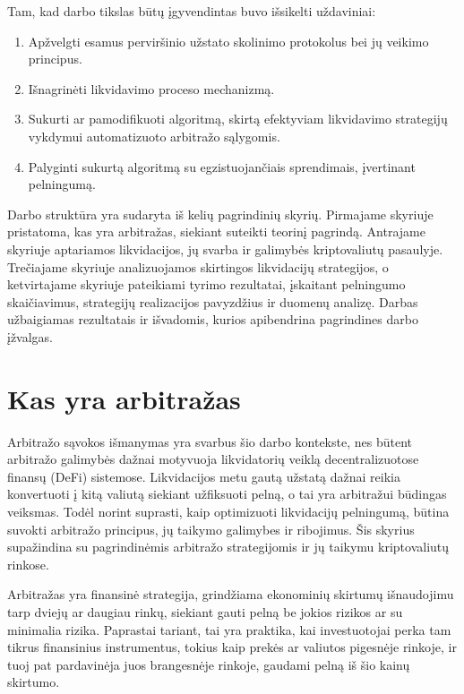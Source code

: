 \documentclass[]{VUMIFTemplateClass}
\begin{document}
Tam, kad darbo tikslas būtų įgyvendintas buvo išsikelti uždaviniai:
\begin{enumerate}
    \item Apžvelgti esamus perviršinio užstato skolinimo protokolus bei jų veikimo principus.
    \item Išnagrinėti likvidavimo proceso mechanizmą.
    \item Sukurti ar pamodifikuoti algoritmą, skirtą efektyviam likvidavimo strategijų vykdymui automatizuoto arbitražo sąlygomis.
    \item Palyginti sukurtą algoritmą su egzistuojančiais sprendimais, įvertinant pelningumą.
\end{enumerate}

Darbo struktūra yra sudaryta iš kelių pagrindinių skyrių. Pirmajame skyriuje pristatoma, kas yra arbitražas, siekiant suteikti teorinį pagrindą. Antrajame skyriuje aptariamos likvidacijos, jų svarba ir galimybės kriptovaliutų pasaulyje. Trečiajame skyriuje analizuojamos skirtingos likvidacijų strategijos, o ketvirtajame skyriuje pateikiami tyrimo rezultatai, įskaitant pelningumo skaičiavimus, strategijų realizacijos pavyzdžius ir duomenų analizę. Darbas užbaigiamas rezultatais ir išvadomis, kurios apibendrina pagrindines darbo įžvalgas.


\section{Kas yra arbitražas}
Arbitražo sąvokos išmanymas yra svarbus šio darbo kontekste, nes būtent arbitražo galimybės dažnai motyvuoja likvidatorių veiklą decentralizuotose finansų (DeFi) sistemose. Likvidacijos metu gautą užstatą dažnai reikia konvertuoti į kitą valiutą siekiant užfiksuoti pelną, o tai yra arbitražui būdingas veiksmas. Todėl norint suprasti, kaip optimizuoti likvidacijų pelningumą, būtina suvokti arbitražo principus, jų taikymo galimybes ir ribojimus. Šis skyrius supažindina su pagrindinėmis arbitražo strategijomis ir jų taikymu kriptovaliutų rinkose.

Arbitražas yra finansinė strategija, grindžiama ekonominių skirtumų išnaudojimu tarp dviejų ar daugiau rinkų, siekiant gauti pelną be jokios rizikos ar su minimalia rizika. Paprastai tariant, tai yra praktika, kai investuotojai perka tam tikrus finansinius instrumentus, tokius kaip prekės ar valiutos pigesnėje rinkoje, ir tuoj pat pardavinėja juos brangesnėje rinkoje, gaudami pelną iš šio kainų skirtumo.
\end{document}
